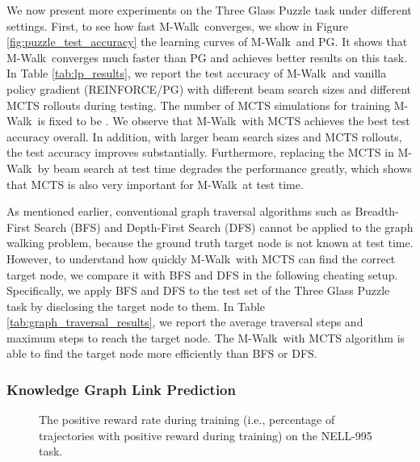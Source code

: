 \documentclass{article}
\newcommand{\modelname}{M-Walk}
\begin{document}
We now present more experiments on the Three Glass Puzzle task under different settings. First, to see how fast \modelname~converges, we show in Figure \ref{fig:puzzle_test_accuracy} the learning curves of \modelname~and PG. It shows that \modelname~converges much faster than PG and achieves better results on this task. In Table \ref{tab:lp_results}, we report the test accuracy of \modelname~and vanilla policy gradient (REINFORCE/PG) with different beam search sizes and different MCTS rollouts during testing. The number of MCTS simulations for training \modelname~is fixed to be . 
We observe that \modelname~with MCTS achieves the best test accuracy overall. In addition, with larger beam search sizes and MCTS rollouts, the test accuracy improves substantially. Furthermore, replacing the MCTS in \modelname~by beam search at test time degrades the performance greatly, which shows that MCTS is also very important for \modelname~at test time. 

As mentioned earlier, conventional graph traversal algorithms such as Breadth-First Search (BFS) and Depth-First Search (DFS) cannot be applied to the graph walking problem, because the ground truth target node is not known at test time. However, to understand how quickly \modelname~with MCTS can find the correct target node, we compare it with BFS and DFS in the following cheating setup. Specifically, we apply BFS and DFS to the test set of the Three Glass Puzzle task by disclosing the target node to them. In Table \ref{tab:graph_traversal_results}, we report the average traversal steps and maximum steps to reach the target node. The \modelname~with MCTS algorithm is able to find the target node more efficiently than BFS or DFS.
	
	
	
	
	
	
	
	
\subsubsection{Knowledge Graph Link Prediction}
\label{Appendix:kbc}



\begin{figure}[t!]
		\centering
			 
			\caption{The positive reward rate during training (i.e., percentage of trajectories with positive reward during training) on the NELL-995 task.}
		\label{fig:kbc_train_success_train2}
	\end{figure}
	
\end{document}
